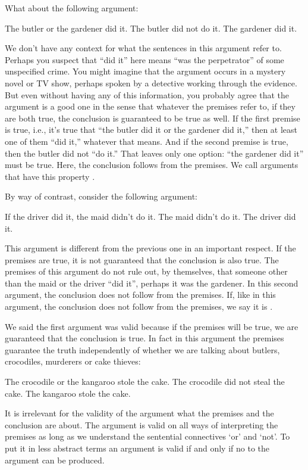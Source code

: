 What about the following argument:
\begin{earg}
	\prem The butler or the gardener did it.
	\prem The butler did not do it.
	\conc The gardener did it.
\end{earg}
We don't have any context for what the sentences in this argument refer to. Perhaps you suspect that ``did it'' here means ``was the perpetrator'' of some unspecified crime. You might imagine that the argument occurs in a mystery novel or TV show, perhaps spoken by a detective working through the evidence. But even without having any of this information, you probably agree that the argument is a good one in the sense that whatever the premises refer to, if they are both true, the conclusion is guaranteed to be true as well. If the first premise is true, i.e., it's true that ``the butler did it or the gardener did it,'' then at least one of them ``did it,'' whatever that means. And if the second premise is true, then the butler did not ``do it.'' That leaves only one option: ``the gardener did it'' must be true. Here, the conclusion follows from the premises. We call arguments that have this property .

By way of contrast, consider the following argument:
\begin{earg}
	\prem If the driver did it, the maid didn't do it.
	\prem The maid didn't do it.
	\conc The driver did it.
\end{earg}
This argument is different from the previous one in an important respect. If the premises are true, it is not guaranteed that the conclusion is also true. The premises of this argument do not rule out, by themselves, that someone other than the maid or the driver ``did it'', perhaps it was the gardener. In this second argument, the conclusion does not follow from the premises. If, like in this argument, the conclusion does not follow from the premises, we say it is .

We said the first argument was valid because if the premises will be true, we are guaranteed  that the conclusion is true. In fact in this argument the premises guarantee the truth independently of whether we are talking about butlers, crocodiles, murderers or cake thieves:
\begin{earg}
	\prem The crocodile or the kangaroo stole the cake.
	\prem The crocodile did not steal the cake.
	\conc The kangaroo stole the cake.
\end{earg}
 It is irrelevant for the validity of the argument what the premises and the conclusion are about. The argument is valid on all ways of interpreting the premises as long as we understand the sentential connectives `or' and `not'. To put it in less abstract terms an argument is valid if and only if no  to the argument can be produced. 

